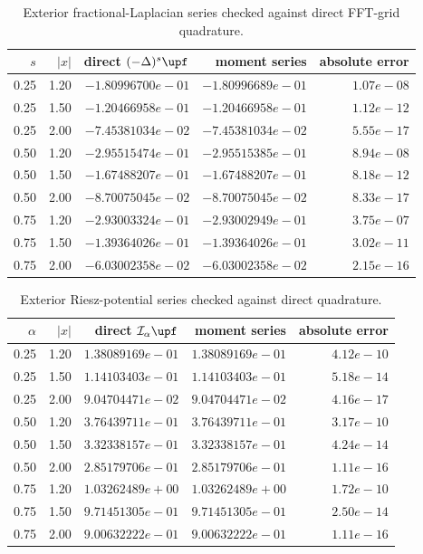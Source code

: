 \begin{table}[htbp]
\centering\small
\begin{tabular}{@{}rrrrr@{}}
\toprule
$s$ & $|x|$ & direct $(-\Delta)^s\upf$ & moment series & absolute error\\
\midrule
0.25 & 1.20 & $-1.80996700e-01$ & $-1.80996689e-01$ & $1.07e-08$\\
0.25 & 1.50 & $-1.20466958e-01$ & $-1.20466958e-01$ & $1.12e-12$\\
0.25 & 2.00 & $-7.45381034e-02$ & $-7.45381034e-02$ & $5.55e-17$\\
0.50 & 1.20 & $-2.95515474e-01$ & $-2.95515385e-01$ & $8.94e-08$\\
0.50 & 1.50 & $-1.67488207e-01$ & $-1.67488207e-01$ & $8.18e-12$\\
0.50 & 2.00 & $-8.70075045e-02$ & $-8.70075045e-02$ & $8.33e-17$\\
0.75 & 1.20 & $-2.93003324e-01$ & $-2.93002949e-01$ & $3.75e-07$\\
0.75 & 1.50 & $-1.39364026e-01$ & $-1.39364026e-01$ & $3.02e-11$\\
0.75 & 2.00 & $-6.03002358e-02$ & $-6.03002358e-02$ & $2.15e-16$\\
\bottomrule\end{tabular}
\caption{Exterior fractional-Laplacian series checked against direct FFT-grid quadrature.}
\label{p10:tab:fraclap-check}
\end{table}
\begin{table}[htbp]
\centering\small
\begin{tabular}{@{}rrrrr@{}}
\toprule
$\alpha$ & $|x|$ & direct $\mathcal I_\alpha\upf$ & moment series & absolute error\\
\midrule
0.25 & 1.20 & $1.38089169e-01$ & $1.38089169e-01$ & $4.12e-10$\\
0.25 & 1.50 & $1.14103403e-01$ & $1.14103403e-01$ & $5.18e-14$\\
0.25 & 2.00 & $9.04704471e-02$ & $9.04704471e-02$ & $4.16e-17$\\
0.50 & 1.20 & $3.76439711e-01$ & $3.76439711e-01$ & $3.17e-10$\\
0.50 & 1.50 & $3.32338157e-01$ & $3.32338157e-01$ & $4.24e-14$\\
0.50 & 2.00 & $2.85179706e-01$ & $2.85179706e-01$ & $1.11e-16$\\
0.75 & 1.20 & $1.03262489e+00$ & $1.03262489e+00$ & $1.72e-10$\\
0.75 & 1.50 & $9.71451305e-01$ & $9.71451305e-01$ & $2.50e-14$\\
0.75 & 2.00 & $9.00632222e-01$ & $9.00632222e-01$ & $1.11e-16$\\
\bottomrule\end{tabular}
\caption{Exterior Riesz-potential series checked against direct quadrature.}
\label{p10:tab:riesz-check}
\end{table}
